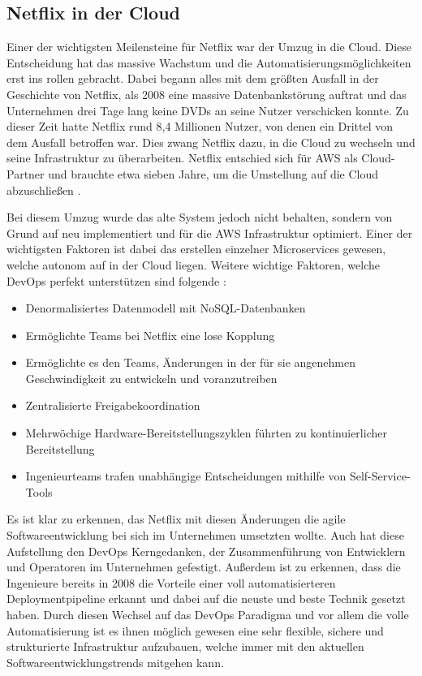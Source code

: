 \subsection{Netflix in der Cloud}

Einer der wichtigsten Meilensteine für Netflix war der Umzug in die Cloud. Diese Entscheidung hat das massive Wachstum und die Automatisierungsmöglichkeiten erst ins rollen gebracht. Dabei begann alles mit dem größten Ausfall in der Geschichte von Netflix, als 2008 eine massive Datenbankstörung auftrat und das Unternehmen drei Tage lang keine DVDs an seine Nutzer verschicken konnte. Zu dieser Zeit hatte Netflix rund 8,4 Millionen Nutzer, von denen ein Drittel von dem Ausfall betroffen war. Dies zwang Netflix dazu, in die Cloud zu wechseln und seine Infrastruktur zu überarbeiten. Netflix entschied sich für AWS als Cloud-Partner und brauchte etwa sieben Jahre, um die Umstellung auf die Cloud abzuschließen \cite{marini2019qualitative, Hiren}.

Bei diesem Umzug wurde das alte System jedoch nicht behalten, sondern von Grund auf neu implementiert und für die AWS Infrastruktur optimiert. Einer der wichtigsten Faktoren ist dabei das erstellen einzelner Microservices gewesen, welche autonom auf in der Cloud liegen. Weitere wichtige Faktoren, welche DevOps perfekt unterstützen sind folgende \cite{Hiren}:

\begin{itemize}
	\item Denormalisiertes Datenmodell mit NoSQL-Datenbanken 
	\item Ermöglichte Teams bei Netflix eine lose Kopplung
	\item Ermöglichte es den Teams, Änderungen in der für sie angenehmen Geschwindigkeit zu entwickeln und voranzutreiben
	\item Zentralisierte Freigabekoordination
	\item Mehrwöchige Hardware-Bereitstellungszyklen führten zu kontinuierlicher Bereitstellung
	\item Ingenieurteams trafen unabhängige Entscheidungen mithilfe von Self-Service-Tools
\end{itemize}

Es ist klar zu erkennen, das Netflix mit diesen Änderungen die agile Softwareentwicklung bei sich im Unternehmen umsetzten wollte. Auch hat diese Aufstellung den DevOps Kerngedanken, der Zusammenführung von Entwicklern und Operatoren im Unternehmen gefestigt. Außerdem ist zu erkennen, dass die Ingenieure bereits in 2008 die Vorteile einer voll automatisierteren Deploymentpipeline erkannt und dabei auf die neuste und beste Technik gesetzt haben. Durch diesen Wechsel auf das DevOps Paradigma und vor allem die volle Automatisierung ist es ihnen möglich gewesen eine sehr flexible, sichere und strukturierte Infrastruktur aufzubauen, welche immer mit den aktuellen Softwareentwicklungstrends mitgehen kann.

